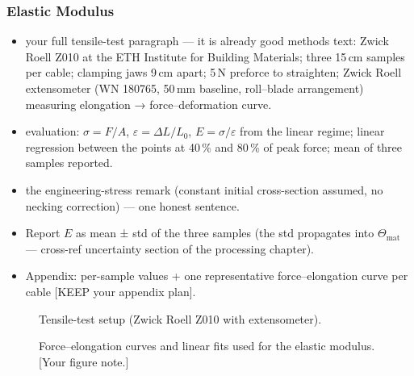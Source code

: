 \subsubsection{Elastic Modulus}
\begin{itemize}
  \item [KEEP] your full tensile-test paragraph — it is already good methods
    text: Zwick Roell Z010 at the ETH Institute for Building Materials;
    three 15\,cm samples per cable; clamping jaws 9\,cm apart; 5\,N preforce
    to straighten; Zwick Roell extensometer (WN 180765, 50\,mm baseline,
    roll–blade arrangement) measuring elongation → force–deformation curve.
  \item [KEEP] evaluation: $\sigma = F/A$, $\varepsilon = \Delta L / L_0$,
    $E = \sigma/\varepsilon$ from the linear regime; linear regression
    between the points at 40\,\% and 80\,\% of peak force; mean of three
    samples reported.
  \item [KEEP] the engineering-stress remark (constant initial
    cross-section assumed, no necking correction) — one honest sentence.
  \item Report $E$ as mean ± std of the three samples (the std propagates
    into $\Theta_\mathrm{mat}$ — cross-ref uncertainty section of the
    processing chapter).
  \item Appendix: per-sample values + one representative force–elongation
    curve per cable [KEEP your appendix plan].
\end{itemize}

\begin{figure}[htb]
  \centering
  \caption{Tensile-test setup (Zwick Roell Z010 with extensometer).}
  \label{fig:methods:tensile}
\end{figure}

\begin{figure}[htb]
  \centering
  \caption{Force–elongation curves and linear fits used for the elastic
    modulus. [Your figure note.]}
  \label{fig:methods:ecurves}
\end{figure}

